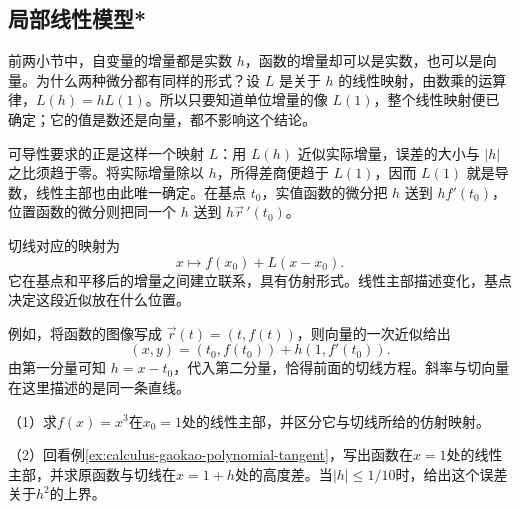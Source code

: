 \subsection{局部线性模型*}
\label{subsec:calculus-linear-model}

前两小节中，自变量的增量都是实数 \(h\)，函数的增量却可以是实数，也可以是向量。为什么两种微分都有同样的形式？设 \(L\) 是关于 \(h\) 的线性映射，由数乘的运算律，\(L(h)=hL(1)\)。所以只要知道单位增量的像 \(L(1)\)，整个线性映射便已确定；它的值是数还是向量，都不影响这个结论。

可导性要求的正是这样一个映射 \(L\)：用 \(L(h)\) 近似实际增量，误差的大小与 \(|h|\) 之比须趋于零。将实际增量除以 \(h\)，所得差商便趋于 \(L(1)\)，因而 \(L(1)\) 就是导数，线性主部也由此唯一确定。在基点 \(t_0\)，实值函数的微分把 \(h\) 送到 \(hf'(t_0)\)，位置函数的微分则把同一个 \(h\) 送到 \(h\vec r\,'(t_0)\)。

切线对应的映射为
\begin{equation*}
 x\longmapsto f(x_0)+L(x-x_0).
\end{equation*}
它在基点和平移后的增量之间建立联系，具有仿射形式。线性主部描述变化，基点决定这段近似放在什么位置。

例如，将函数的图像写成 \(\vec r(t)=(t,f(t))\)，则向量的一次近似给出
\[
 (x,y)=(t_0,f(t_0))+h(1,f'(t_0)).
\]
由第一分量可知 \(h=x-t_0\)，代入第二分量，恰得前面的切线方程。斜率与切向量在这里描述的是同一条直线。

\begin{exercise}
\mbox{}\par\nobreak

（1）求\(f(x)=x^3\)在\(x_0=1\)处的线性主部，并区分它与切线所给的仿射映射。

（2）回看例\ref{ex:calculus-gaokao-polynomial-tangent}，写出函数在\(x=1\)处的线性主部，并求原函数与切线在\(x=1+h\)处的高度差。当\(|h|\le1/10\)时，给出这个误差关于\(h^2\)的上界。
\end{exercise}
